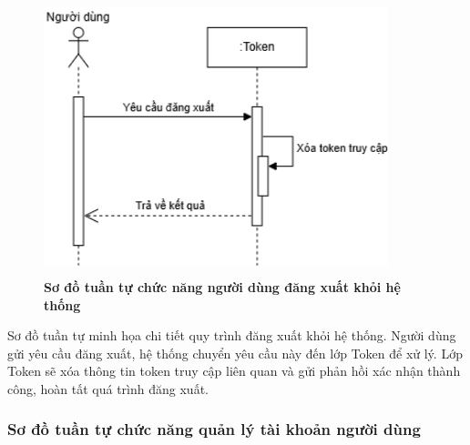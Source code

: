 \begin{figure}[H]
	\centering
	\includegraphics[width=10cm,height=8cm]{Images/sequence/user/logout.drawio.png}
	\caption[Sơ đồ tuần tự chức năng người dùng đăng xuất khỏi hệ thống]{\bfseries \fontsize{12pt}{0pt}
		\selectfont Sơ đồ tuần tự chức năng người dùng đăng xuất khỏi hệ thống}
	\label{sequence_logout} %
\end{figure}
Sơ đồ tuần tự minh họa chi tiết quy trình đăng xuất khỏi hệ thống. Người dùng gửi yêu cầu đăng xuất, hệ thống chuyển yêu cầu này đến lớp Token để xử lý.
Lớp Token sẽ xóa thông tin token truy cập liên quan và gửi phản hồi xác nhận thành công, hoàn tất quá trình đăng xuất.

\subsubsection{Sơ đồ tuần tự chức năng quản lý tài khoản người dùng}

